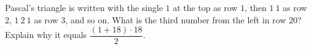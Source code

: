 Pascal's triangle is written with the single $1$ at the top as row $1$, then $1\ 1$ as row $2$, $1\ 2\ 1$ as row $3$, and so on. What is the third number from the left in row $20$? Explain why it equals $\dfrac{(1+18)\cdot18}{2}$.
